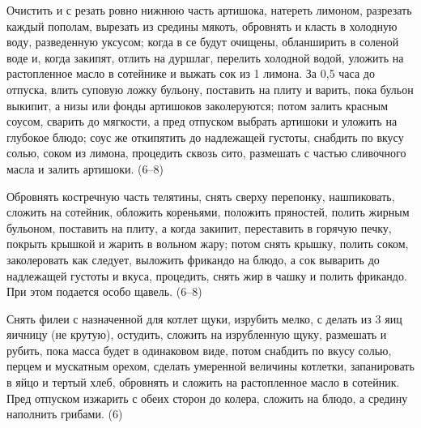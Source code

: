 
Очистить и с резать ровно нижнюю часть артишока, натереть лимоном, разрезать каждый пополам, вырезать из средины мякоть, обровнять и класть в холодную воду, разведенную уксусом; когда в се будут очищены, обланширить в соленой воде и, когда закипят, отлить на дуршлаг, перелить холодной водой, уложить на растопленное масло в сотейнике и выжать сок из 1 лимона. За 0,5 часа до отпуска, влить суповую ложку бульону, поставить на плиту и варить, пока бульон выкипит, а низы или фонды артишоков заколеруются; потом залить красным соусом, сварить до мягкости, а пред отпуском выбрать артишоки и уложить на глубокое блюдо; соус же откипятить до надлежащей густоты, снабдить по вкусу солью, соком из лимона, процедить сквозь сито, размешать с частью сливочного масла и залить артишоки. (6--8) 


Обровнять костречную часть телятины, снять сверху перепонку, нашпиковать, сложить на сотейник, обложить кореньями, положить пряностей, полить жирным бульоном, поставить на плиту, а когда закипит, переставить в горячую печку, покрыть крышкой и жарить в вольном жару; потом снять крышку, полить соком, заколеровать как следует, выложить фрикандо на блюдо, а сок выварить до надлежащей густоты и вкуса, процедить, снять жир в чашку и полить фрикандо. При этом подается особо щавель. (6--8) 


Снять филеи с назначенной для котлет щуки, изрубить мелко, с делать из 3 яиц яичницу (не крутую), остудить, сложить на изрубленную щуку, размешать и рубить, пока масса будет в одинаковом виде, потом снабдить по вкусу солью, перцем и мускатным орехом, сделать умеренной величины котлетки, запанировать в яйцо и тертый хлеб, обровнять и сложить на растопленное масло в сотейник. Пред отпуском изжарить с обеих сторон до колера, сложить на блюдо, а средину наполнить грибами. (6) 


